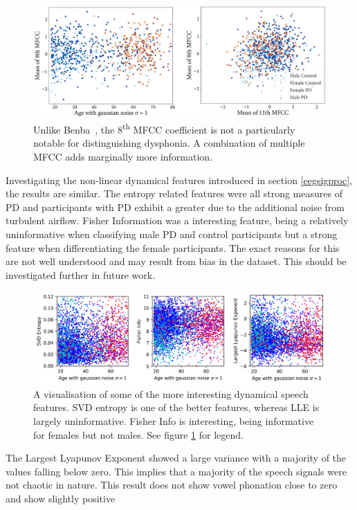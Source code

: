 \documentclass[12pt, twoside]{book}
\begin{document}
\begin{figure}[h]
	\caption{Unlike Benba~\cite{benba2014mfcc}, the 8\textsuperscript{th} MFCC coefficient is not a particularly notable for distinguishing dysphonia. A combination of multiple MFCC adds marginally more information. }
	\label{mfcc_feat}
	\centering\includegraphics[width=1\linewidth]{mfcc_feat.png}
\end{figure}


Investigating the non-linear dynamical features introduced in section \ref{eegsigproc}, the results are similar. The entropy related features were all strong measures of PD and participants with PD exhibit a greater due to the additional noise from turbulent airflow. Fisher Information was a interesting feature, being a relatively uninformative when classifying male PD and control participants but a strong feature when differentiating the female participants. The exact reasons for this are not well understood and may result from bias in the dataset. This should be investigated further in future work.


\begin{figure}[h]
	\caption{A visualisation of some of the more interesting dynamical speech features. SVD entropy is one of the better features, whereas LLE is largely uninformative. Fisher Info is interesting, being informative for females but not males. See figure \ref{mfcc_feat} for legend.}
	\label{speechdynamic}
	\centering\centerline{\includegraphics[width=1.1\linewidth]{speech_dynamic.png}}
\end{figure}

The Largest Lyapunov Exponent showed a large variance with a majority of the values falling below zero. This implies that a majority of the speech signals were not chaotic in nature. This result does not \cite{lyapunovzero, banbrook1999speechlyapunov} show vowel phonation close to zero and \cite{kokkinos2005nonlinearlyapunov,lyapunovpositive} show slightly positive
\end{document}
